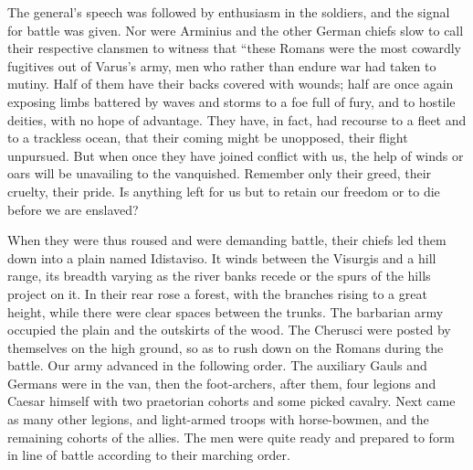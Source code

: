 
The general's speech was followed by enthusiasm in the soldiers, and the signal for battle was given. Nor were Arminius and the other German chiefs slow to call their respective clansmen to witness that ``these Romans were the most cowardly fugitives out of Varus's army, men who rather than endure war had taken to mutiny. Half of them have their backs covered with wounds; half are once again exposing limbs battered by waves and storms to a foe full of fury, and to hostile deities, with no hope of advantage. They have, in fact, had recourse to a fleet and to a trackless ocean, that their coming might be unopposed, their flight unpursued. But when once they have joined conflict with us, the help of winds or oars will be unavailing to the vanquished. Remember only their greed, their cruelty, their pride. Is anything left for us but to retain our freedom or to die before we are enslaved?


When they were thus roused and were demanding battle, their chiefs led them down into a plain named Idistaviso. It winds between the Visurgis and a hill range, its breadth varying as the river banks recede or the spurs of the hills project on it. In their rear rose a forest, with the branches rising to a great height, while there were clear spaces between the trunks. The barbarian army occupied the plain and the outskirts of the wood. The Cherusci were posted by themselves on the high ground, so as to rush down on the Romans during the battle. Our army advanced in the following order. The auxiliary Gauls and Germans were in the van, then the foot-archers, after them, four legions and Caesar himself with two praetorian cohorts and some picked cavalry. Next came as many other legions, and light-armed troops with horse-bowmen, and the remaining cohorts of the allies. The men were quite ready and prepared to form in line of battle according to their marching order.



